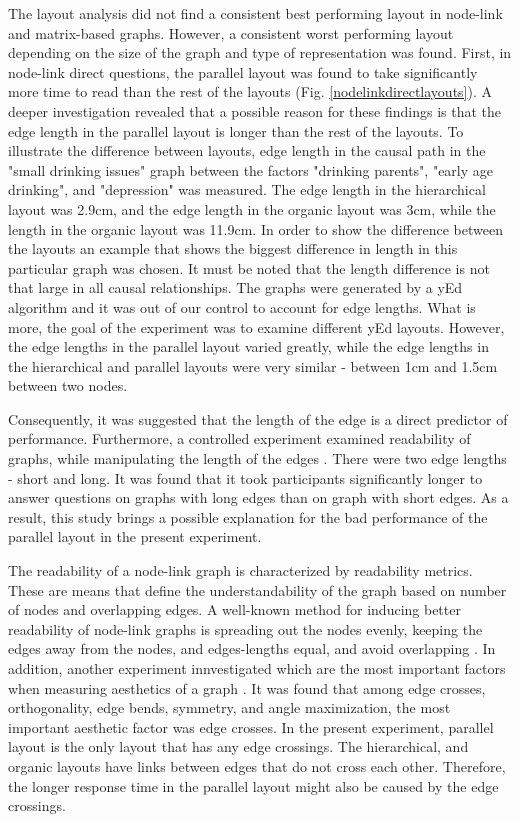 \documentclass{l4proj}
\begin{document}
The layout analysis did not find a consistent best performing layout in node-link and matrix-based graphs. However, a consistent worst performing layout depending on the size of the graph and type of representation was found. First, in node-link direct questions, the parallel layout was found to take significantly more time to read than the rest of the layouts (Fig.  \ref{nodelinkdirectlayouts}). A deeper investigation revealed that a possible reason for these findings is that the edge length in the parallel layout is longer than the rest of the layouts. To illustrate the difference between layouts, edge length in the causal path in the "small drinking issues" graph between the factors "drinking parents", "early age drinking", and "depression" was measured. The edge length in the hierarchical layout was 2.9cm, and the edge length in the organic layout was 3cm, while the length in the organic layout was 11.9cm. In order to show the difference between the layouts an example that shows the biggest difference in length in this particular graph was chosen. It must be noted that the length difference is not that large in all causal relationships. The graphs were generated by a yEd algorithm and it was out of our control to account for edge lengths. What is more, the goal of the experiment was to examine different yEd layouts. However, the edge lengths in the parallel layout varied greatly, while the edge lengths in the hierarchical and parallel layouts were very similar - between 1cm and 1.5cm between two nodes. 

Consequently, it was suggested that the length of the edge is a direct predictor of performance. Furthermore, a controlled experiment examined readability of graphs, while manipulating the length of the edges \cite{holten2011extended}. There were two edge lengths - short and long. It was found that it took participants significantly longer to answer questions on graphs with long edges than on graph with short edges. As a result, this study brings a possible explanation for the bad performance of the parallel layout in the present experiment.

The readability of a node-link graph is characterized by readability metrics. These are means that define the understandability of the graph based on number of nodes and overlapping edges. A well-known method for inducing better readability of node-link graphs is spreading out the nodes evenly, keeping the edges away from the nodes, and edges-lengths equal, and avoid overlapping \cite{dunne2015readability}. In addition, another experiment innvestigated which are the most important factors when measuring aesthetics of a graph \cite{purchase1997aesthetic}. It was found that among edge crosses, orthogonality, edge bends, symmetry, and angle maximization, the most important aesthetic factor was edge crosses. In the present experiment, parallel layout is the only layout that has any edge crossings. The hierarchical, and organic layouts have links between edges that do not cross each other. Therefore, the longer response time in the parallel layout might also be caused by the edge crossings.
\end{document}

